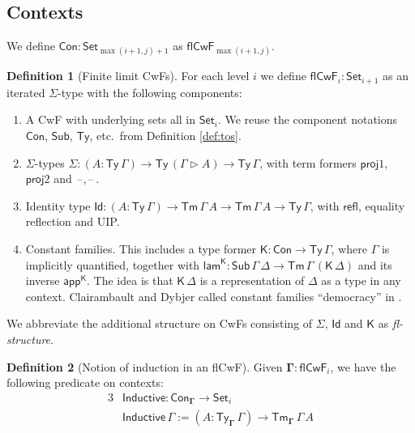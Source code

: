 \documentclass{article}
\theoremstyle{definition}
\newtheorem{definition}{Definition}
\theoremstyle{theorem}
\newcommand{\refl}{\mathsf{refl}}
\newcommand{\Con}{\mathsf{Con}}
\newcommand{\Sub}{\mathsf{Sub}}
\newcommand{\Tm}{\mathsf{Tm}}
\newcommand{\Ty}{\mathsf{Ty}}
\newcommand{\Id}{\mathsf{Id}}
\newcommand{\proj}{\mathsf{proj}}
\newcommand{\blank}{\mathord{\hspace{1pt}\text{--}\hspace{1pt}}}
\newcommand{\ra}{\rightarrow}
\newcommand{\Set}{\mathsf{Set}}
\newcommand{\ext}{\triangleright}
\newcommand{\Inductive}{\mathsf{Inductive}}
\newcommand{\Sg}{\Sigma}
\newcommand{\flCwF}{\mathsf{flCwF}}
\newcommand{\Kfam}{\mathsf{K}}
\newcommand{\K}{\mathsf{K}}
\newcommand{\lamK}{\mathsf{lam}^{\K}}
\newcommand{\appK}{\mathsf{app}^{\K}}
\newcommand{\bCon}{\boldsymbol{\Con}}
\newcommand{\bGamma}{\boldsymbol{\Gamma}}
\begin{document}
\subsection{Contexts}

We define $\bCon : \Set_{\max(i+1,j)+1}$ as $\flCwF_{\max(i+1,j)}$.

\begin{definition}[Finite limit CwFs]\label{def:flCwF}
For each level $i$ we define $\flCwF_i : \Set_{i+1}$ as an iterated $\Sigma$-type
with the following components:
\begin{enumerate}
  \item A CwF with underlying sets all in $\Set_i$. We reuse the component
    notations $\Con$, $\Sub$, $\Ty$, etc.\ from Definition \ref{def:tos}.
  \item $\Sigma$-types $\Sg : (A : \Ty\,\Gamma)\ra \Ty\,(\Gamma \ext A)
    \ra \Ty\,\Gamma$, with term formers $\proj1$, $\proj2$ and $\blank,\blank$.
  \item Identity type $\Id : (A : \Ty\,\Gamma)\ra \Tm\,\Gamma\,A\ra
    \Tm\,\Gamma\,A\ra \Ty\,\Gamma$, with $\refl$, equality reflection and UIP.
  \item Constant families. This includes a type former $\Kfam : \Con \ra
    \Ty\,\Gamma$, where $\Gamma$ is implicitly quantified, together with $\lamK
    : \Sub\,\Gamma\,\Delta \ra \Tm\,\Gamma\,(\Kfam\,\Delta)$ and its inverse
    $\appK$. The idea is that $\Kfam\,\Delta$ is a representation of $\Delta$ as
    a type in any context. Clairambault and Dybjer called constant families
    ``democracy'' in \cite{clairambault2014biequivalence}.
\end{enumerate}
We abbreviate the additional structure on CwFs consisting of $\Sigma$, $\Id$ and
$\Kfam$ as \emph{fl-structure}.
\end{definition}

\begin{definition}[Notion of induction in an flCwF]\label{def:induction}
Given $\bGamma : \flCwF_i$, we have the following predicate on contexts:
\begin{alignat*}{3}
  & \Inductive : \Con_{\bGamma} \ra \Set_i \\
  & \Inductive\,\Gamma := (A : \Ty_{\boldsymbol{\Gamma}}\,\Gamma)\ra \Tm_{\bGamma}\,\Gamma\,A
\end{alignat*}
\end{definition}
\end{document}
